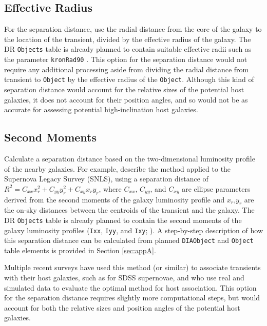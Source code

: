 \documentclass[DM,lsstdraft,authoryear,toc]{lsstdoc}
\begin{document}
\subsection{Effective Radius}\label{ssec:options_Re}

For the separation distance, use the radial distance from the core of the galaxy to the location of the transient, divided by the effective radius of the galaxy.
The DR {\tt Objects} table is already planned to contain suitable effective radii such as the parameter {\tt kronRad90} .
This option for the separation distance would not require any additional processing aside from dividing the radial distance from transient to {\tt Object} by the effective radius of the {\tt Object}.
Although this kind of separation distance would account for the relative sizes of the potential host galaxies, it does not account for their position angles, and so would not be as accurate for assessing potential high-inclination host galaxies.

\subsection{Second Moments}

Calculate a separation distance based on the two-dimensional luminosity profile of the nearby galaxies.
For example, \citet{2006ApJ...648..868S} describe the method applied to the Supernova Legacy Survey (SNLS), using a separation distance of $R^2 = C_{xx} x_r^2 + C_{yy} y_r^2 + C_{xy} x_r y_r$, where $C_{xx}$, $C_{yy}$, and $C_{xy}$ are ellipse parameters derived from the second moments of the galaxy luminosity profile and $x_r$,$y_r$ are the on-sky distances between the centroids of the transient and the galaxy.
The DR {\tt Objects} table is already planned to contain the second moments of the galaxy luminosity profiles ({\tt Ixx}, {\tt Iyy}, and {\tt Ixy}; ).
A step-by-step description of how this separation distance can be calculated from planned {\tt DIAObject} and {\tt Object} table elements is provided in Section \ref{sec:appA}.

Multiple recent surveys have used this method (or similar) to associate transients with their host galaxies, such as \citet{2018PASP..130f4002S} for SDSS supernovae, and \citet{2016AJ....152..154G} who use real and simulated data to evaluate the optimal method for host association.
This option for the separation distance requires slightly more computational steps, but would account for both the relative sizes and position angles of the potential host galaxies. 
\end{document}
